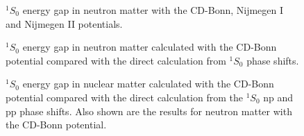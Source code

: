 \clearpage

\begin{figure}
    
    \caption{$^1S_0$ energy gap in neutron matter with the CD-Bonn, 
             Nijmegen I and Nijmegen II potentials.}
    \label{fig:fig1}
\end{figure}

\begin{figure}
    
    \caption{$^1S_0$ energy gap in neutron matter calculated with  
             the CD-Bonn potential compared with the direct calculation 
             from $^1S_0$ phase shifts.}
    \label{fig:fig2}
\end{figure} 

\begin{figure}
    
	\caption{$^1S_0$ energy gap in nuclear matter calculated with  
                 the CD-Bonn potential  
                 compared with the direct calculation from the 
                 $^1S_0$ np and pp phase shifts.  Also shown are the results 
     for neutron matter with the CD-Bonn potential.}
    \label{fig:fig3}
\end{figure}	
















